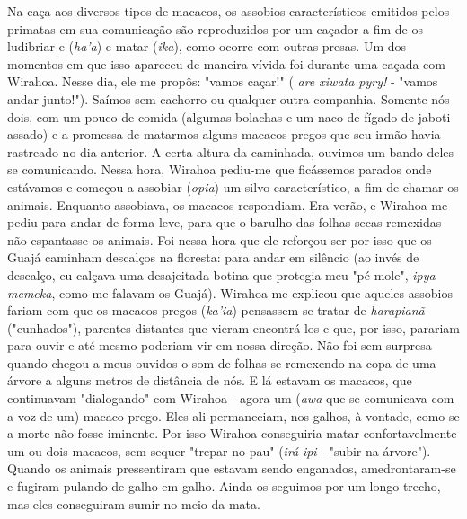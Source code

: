 Na caça aos diversos tipos de macacos, os assobios característicos
emitidos pelos primatas em sua comunicação são reproduzidos por um
caçador a fim de os ludibriar e (\emph{ha'a}) e matar (\emph{ika}), como
ocorre com outras presas. Um dos momentos em que isso apareceu de
maneira vívida foi durante uma caçada com Wirahoa. Nesse dia, ele me
propôs: "vamos caçar!" ( \emph{are xiwata pyry!} - "vamos andar
junto!"). Saímos sem cachorro ou qualquer outra companhia. Somente nós
dois, com um pouco de comida (algumas bolachas e um naco de fígado de
jaboti assado) e a promessa de matarmos alguns macacos-pregos que seu
irmão havia rastreado no dia anterior. A certa altura da caminhada,
ouvimos um bando deles se comunicando. Nessa hora, Wirahoa pediu-me que
ficássemos parados onde estávamos e começou a assobiar (\emph{opia}) um
silvo característico, a fim de chamar os animais. Enquanto assobiava, os
macacos respondiam. Era verão, e Wirahoa me pediu para andar de forma
leve, para que o barulho das folhas secas remexidas não espantasse os
animais. Foi nessa hora que ele reforçou ser por isso que os Guajá
caminham descalços na floresta: para andar em silêncio (ao invés de
descalço, eu calçava uma desajeitada botina que protegia meu "pé mole",
\emph{ipya} \emph{memeka}, como me falavam os Guajá). Wirahoa me
explicou que aqueles assobios fariam com que os macacos-pregos
(\emph{ka'ia}) pensassem se tratar de \emph{harapianã} ("cunhados"),
parentes distantes que vieram encontrá-los e que, por isso, parariam
para ouvir e até mesmo poderiam vir em nossa direção. Não foi sem
surpresa quando chegou a meus ouvidos o som de folhas se remexendo na
copa de uma árvore a alguns metros de distância de nós. E lá estavam os
macacos, que continuavam "dialogando" com Wirahoa - agora um (\emph{awa}
que se comunicava com a voz de um) macaco-prego. Eles ali permaneciam,
nos galhos, à vontade, como se a morte não fosse iminente. Por isso
Wirahoa conseguiria matar confortavelmente um ou dois macacos, sem
sequer "trepar no pau" (\emph{irá} \emph{ipi} - "subir na árvore").
Quando os animais pressentiram que estavam sendo enganados,
amedrontaram-se e fugiram pulando de galho em galho. Ainda os seguimos
por um longo trecho, mas eles conseguiram sumir no meio da mata.

